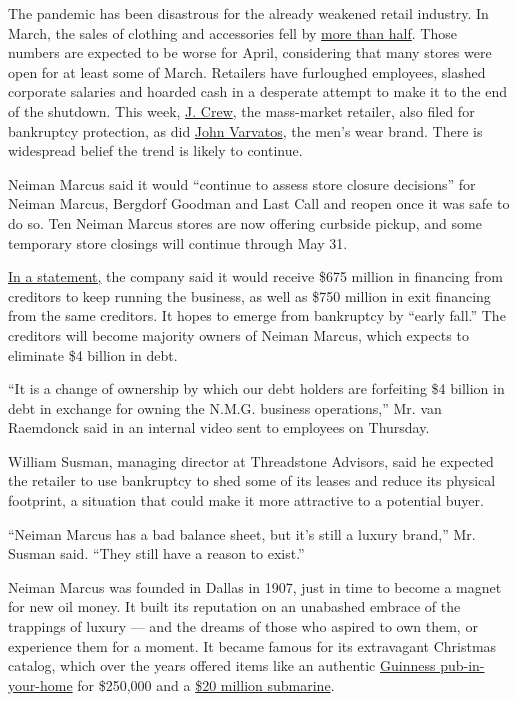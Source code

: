 The pandemic has been disastrous for the already weakened retail
industry. In March, the sales of clothing and accessories fell by
\href{https://www.nytimes3xbfgragh.onion/2020/04/15/business/economy/coronavirus-retail-sales.html?searchResultPosition=1}{more
than half}. Those numbers are expected to be worse for April,
considering that many stores were open for at least some of March.
Retailers have furloughed employees, slashed corporate salaries and
hoarded cash in a desperate attempt to make it to the end of the
shutdown. This week,
\href{https://www.nytimes3xbfgragh.onion/2020/05/03/business/j-crew-bankruptcy-coronavirus.html}{J.
Crew}, the mass-market retailer, also filed for bankruptcy protection,
as did
\href{https://www.bloomberg.com/news/articles/2020-05-06/rock-star-outfitter-john-varvatos-s-firm-files-for-bankruptcy}{John
Varvatos}, the men's wear brand. There is widespread belief the trend is
likely to continue.

Neiman Marcus said it would ``continue to assess store closure
decisions'' for Neiman Marcus, Bergdorf Goodman and Last Call and reopen
once it was safe to do so. Ten Neiman Marcus stores are now offering
curbside pickup, and some temporary store closings will continue through
May 31.

\href{https://cases.stretto.com/public/X064/10214/faqs/0914eddd-2efd-43c3-a078-9a830cf641da.pdf}{In
a statement,} the company said it would receive \$675 million in
financing from creditors to keep running the business, as well as \$750
million in exit financing from the same creditors. It hopes to emerge
from bankruptcy by ``early fall.'' The creditors will become majority
owners of Neiman Marcus, which expects to eliminate \$4 billion in debt.

``It is a change of ownership by which our debt holders are forfeiting
\$4 billion in debt in exchange for owning the N.M.G. business
operations,'' Mr. van Raemdonck said in an internal video sent to
employees on Thursday.

William Susman, managing director at Threadstone Advisors, said he
expected the retailer to use bankruptcy to shed some of its leases and
reduce its physical footprint, a situation that could make it more
attractive to a potential buyer.

``Neiman Marcus has a bad balance sheet, but it's still a luxury
brand,'' Mr. Susman said. ``They still have a reason to exist.''

Neiman Marcus was founded in Dallas in 1907, just in time to become a
magnet for new oil money. It built its reputation on an unabashed
embrace of the trappings of luxury --- and the dreams of those who
aspired to own them, or experience them for a moment. It became famous
for its extravagant Christmas catalog, which over the years offered
items like an authentic
\href{https://www.trendhunter.com/trends/250000-home-pub-mark-guinness-250th-birthday-in-style}{Guinness
pub-in-your-home} for \$250,000 and a
\href{https://www.nytimes3xbfgragh.onion/2000/10/29/business/responsible-party-karen-katz-submarines-for-sale-one-size-fits-all.html}{\$20
million submarine}.

